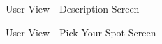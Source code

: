 \documentclass[12pt, titlepage]{article}
\begin{document}
\begin{figure}[hp!]
\begin{center}
    \caption{User View - Description Screen}
    \label{fig:description}
    \end{center}
\end{figure}

\begin{figure}[hp!]
\begin{center}
    \caption{User View - Pick Your Spot Screen}
    \label{fig:pickspot}
    \end{center}
\end{figure}
\end{document}
